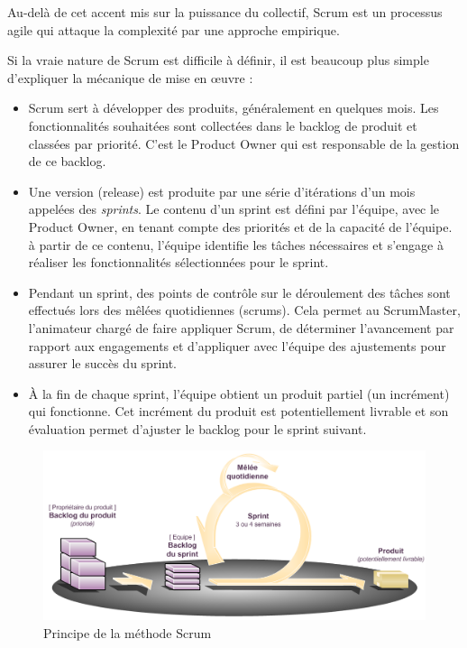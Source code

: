 \documentclass[12pt, ChapStyle1, oneside]{./Styles/Dea_Gsm}
\begin{document}
Au-delà de cet accent mis sur la puissance du collectif, Scrum est un processus agile qui attaque la complexité par une approche empirique.

Si la vraie nature de Scrum est difficile à définir, il est beaucoup plus simple d’expliquer la mécanique de mise en œuvre :

\begin{itemize}
  \item Scrum sert à développer des produits, généralement en quelques mois. Les fonctionnalités souhaitées sont collectées dans le backlog de produit et classées par priorité. C’est le Product Owner qui est responsable de la gestion de ce backlog.
  \item Une version (release) est produite par une série d’itérations d’un mois appelées des \textit{sprints}. Le contenu d’un sprint est défini par l’équipe, avec le Product Owner, en tenant compte des priorités et de la capacité de l’équipe. à partir de ce contenu, l’équipe identifie les tâches nécessaires et s’engage à réaliser les fonctionnalités sélectionnées pour le sprint.
  \item Pendant un sprint, des points de contrôle sur le déroulement des tâches sont effectués lors des mêlées quotidiennes (scrums). Cela permet au ScrumMaster, l’animateur chargé de faire appliquer Scrum, de déterminer l’avancement par rapport aux engagements et d’appliquer avec l’équipe des ajustements pour assurer le succès du sprint.
  \item À la fin de chaque sprint, l’équipe obtient un produit partiel (un incrément) qui fonctionne. Cet incrément du produit est potentiellement livrable et son évaluation permet d’ajuster le backlog pour le sprint suivant.
\end{itemize}
\begin{figure}[H]
    \centering
    \includegraphics[width=5.0in]{scrum}
    \caption{Principe de la méthode Scrum}
    \label{Scrum}
\end{figure}
\end{document}
